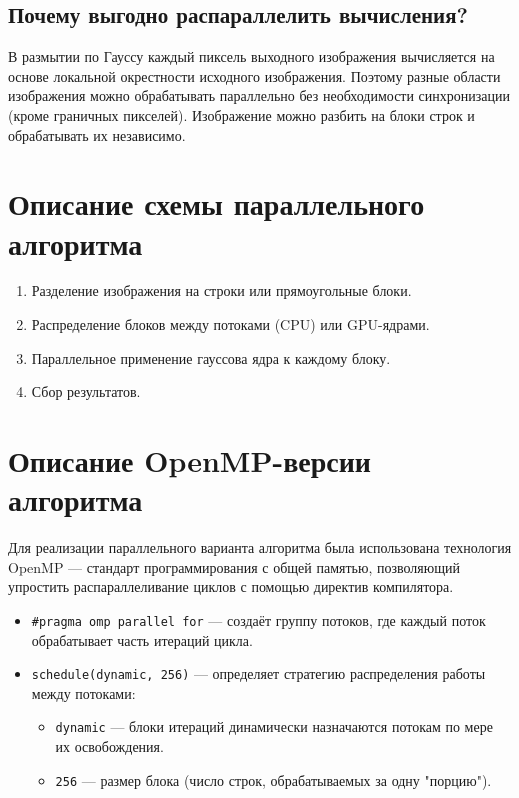 \documentclass[a4paper,12pt]{article}
\begin{document}
\subsection*{Почему выгодно распараллелить вычисления?}
В размытии по Гауссу каждый пиксель выходного изображения вычисляется на основе локальной окрестности исходного изображения. Поэтому разные области изображения можно обрабатывать параллельно без необходимости синхронизации (кроме граничных пикселей). Изображение можно разбить на блоки строк и обрабатывать их независимо.

\section*{Описание схемы параллельного алгоритма}
\begin{enumerate}
    \item Разделение изображения на строки или прямоугольные блоки.
    \item Распределение блоков между потоками (CPU) или GPU-ядрами.
    \item Параллельное применение гауссова ядра к каждому блоку.
    \item Сбор результатов.
\end{enumerate}

\section*{Описание OpenMP-версии алгоритма}
Для реализации параллельного варианта алгоритма была использована технология OpenMP — стандарт программирования с общей памятью, позволяющий упростить распараллеливание циклов с помощью директив компилятора.

\begin{itemize}
    \item \texttt{\#pragma omp parallel for} — создаёт группу потоков, где каждый поток обрабатывает часть итераций цикла.
    \item \texttt{schedule(dynamic, 256)} — определяет стратегию распределения работы между потоками:
    \begin{itemize}
        \item \texttt{dynamic} — блоки итераций динамически назначаются потокам по мере их освобождения.
        \item \texttt{256} — размер блока (число строк, обрабатываемых за одну "порцию").
    \end{itemize}
\end{itemize}
\end{document}
